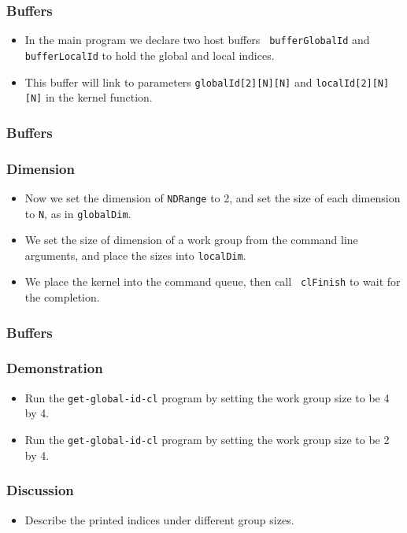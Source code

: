 \documentclass{beamer}
\begin{document}
\begin{frame}
  \frametitle{Buffers}
  \begin{itemize}
    \item In the main program we declare two host buffers {\tt
      bufferGlobalId} and {\tt bufferLocalId} to hold the global and
      local indices.
    \item This buffer will link to parameters {\tt globalId[2][N][N]}
      and {\tt localId[2][N][N]} in the kernel function.
  \end{itemize}
\end{frame}

\begin{frame}
  \frametitle{Buffers}
\end{frame}

\begin{frame}
  \frametitle{Dimension}
  \begin{itemize}
    \item Now we set the dimension of {\tt NDRange} to 2, and set the
      size of each dimension to {\tt N}, as in {\tt globalDim}.
    \item We set the size of dimension of a work group from the
      command line arguments, and place the sizes into {\tt localDim}.
    \item We place the kernel into the command queue, then call {\tt
      clFinish} to wait for the completion.
  \end{itemize}
\end{frame}

\begin{frame}
  \frametitle{Buffers}
\end{frame}

\begin{frame}
  \frametitle{Demonstration}
  \begin{itemize}
    \item Run the {\tt get-global-id-cl} program by setting the work
      group size to be 4 by 4.
    \item Run the {\tt get-global-id-cl} program by setting the work
      group size to be 2 by 4.
  \end{itemize}
\end{frame}

\begin{frame}
  \frametitle{Discussion}
  \begin{itemize}
  \item Describe the printed indices under different group sizes.
  \end{itemize}
\end{frame}
\end{document}
